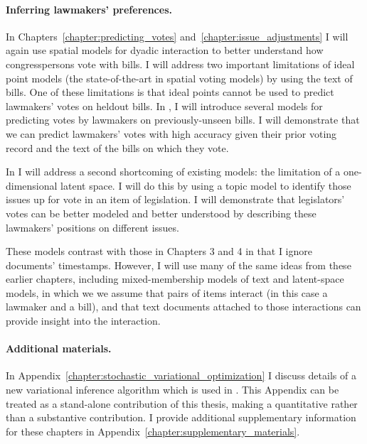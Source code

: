 
\paragraph{Inferring lawmakers' preferences.}

In Chapters~\ref{chapter:predicting_votes}
and~\ref{chapter:issue_adjustments} I will again use spatial models
for dyadic interaction to better understand how congresspersons vote
with bills.  I will address two important limitations of ideal point
models (the state-of-the-art in spatial voting models) by using the
text of bills.  One of these limitations is that ideal points cannot
be used to predict lawmakers' votes on heldout bills.  In
, I will introduce several models for
predicting votes by lawmakers on previously-unseen bills.  I will
demonstrate that we can predict lawmakers' votes with high accuracy
given their prior voting record and the text of the bills on which
they vote.

In  I will address a second shortcoming of
existing models: the limitation of a one-dimensional latent space.  I
will do this by using a topic model to identify those issues up for
vote in an item of legislation.  I will demonstrate that legislators'
votes can be better modeled and better understood by describing these
lawmakers' positions on different issues.

These models contrast with those in Chapters 3 and 4 in that I ignore
documents' timestamps.  However, I will use many of the same ideas
from these earlier chapters, including mixed-membership models of text
and latent-space models, in which we we assume that pairs of items
interact (in this case a lawmaker and a bill), and that text documents
attached to those interactions can provide insight into the
interaction.

\paragraph{Additional materials.}
In Appendix~\ref{chapter:stochastic_variational_optimization} I
discuss details of a new variational inference algorithm which is used
in .  This Appendix can be treated as a
stand-alone contribution of this thesis, making a quantitative rather
than a substantive contribution.  I provide additional supplementary
information for these chapters in
Appendix~\ref{chapter:supplementary_materials}.
